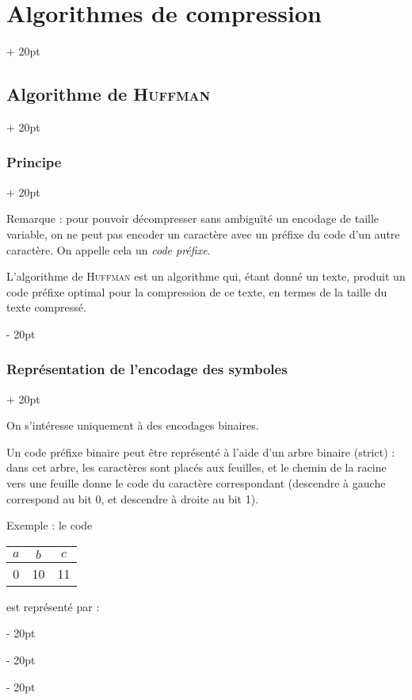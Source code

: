 \documentclass[a4paper, 12pt, twoside]{article}
\newcommand{\ind}[1][20pt]{\advance\leftskip + #1}
\newcommand{\deind}[1][20pt]{\advance\leftskip - #1}
\newenvironment{indt}[2][20pt]{#2 \par \ind[#1]}{\par \deind} %
\begin{document}
\begin{indt}{\section{Algorithmes de compression}}
\begin{indt}{\subsection{Algorithme de \textsc{Huffman}}}
\begin{indt}{\subsubsection{Principe}}
                \vspace{6pt}
                
                Remarque : pour pouvoir décompresser sans ambiguïté un encodage de taille variable, on ne peut pas encoder un caractère avec un préfixe du code d'un autre caractère. On appelle cela un \textit{code préfixe}.

                L'algorithme de \textsc{Huffman} est un algorithme qui, étant donné un texte, produit un code préfixe optimal pour la compression de ce texte, en termes de la taille du texte compressé.
            \end{indt}

            \vspace{12pt}
            
            \begin{indt}{\subsubsection{Représentation de l'encodage des symboles}}
                \label{2.2.2}

                On s'intéresse uniquement à des encodages binaires.
                
                Un code préfixe binaire peut être représenté à l'aide d'un arbre binaire (strict) : dans cet arbre, les caractères sont placés aux feuilles, et le chemin de la racine vers une feuille donne le code du caractère correspondant (descendre à gauche correspond au bit 0, et descendre à droite au bit 1).

                \vspace{12pt}
                
                Exemple : le code
                \begin{tabular}{|c|c|c|}
                    \hline
                    $a$ & $b$ & $c$
                    \\
                    \hline
                    0 & 10 & 11
                    \\
                    \hline
                \end{tabular}
                est représenté par :

                \begin{center}
                \end{center}


\end{indt}
\end{indt}
\end{indt}
\end{document}
